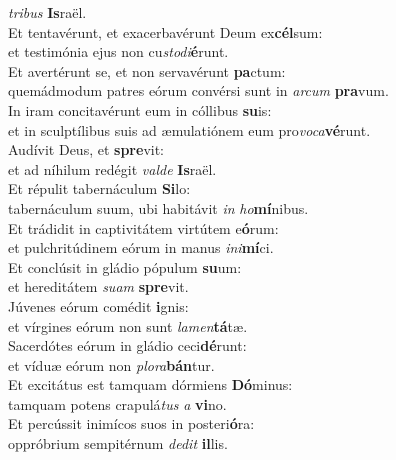 \oddverse \textit{tri}\textit{bus} \textbf{Is}raël.\\
\evenverse Et tentavérunt, et exacerbavérunt Deum ex\textbf{cél}sum:~\*\\
\evenverse et testimónia ejus non cu\textit{sto}\textit{di}\textbf{é}runt.\\
\oddverse Et avertérunt se, et non servavérunt \textbf{pa}ctum:~\*\\
\oddverse quemádmodum patres eórum convérsi sunt in \textit{ar}\textit{cum} \textbf{pra}vum.\\
\evenverse In iram concitavérunt eum in cóllibus \textbf{su}is:~\*\\
\evenverse et in sculptílibus suis ad æmulatiónem eum pro\textit{vo}\textit{ca}\textbf{vé}runt.\\
\oddverse Audívit Deus, et \textbf{spre}vit:~\*\\
\oddverse et ad níhilum redégit \textit{val}\textit{de} \textbf{Is}raël.\\
\evenverse Et répulit tabernáculum \textbf{Si}lo:~\*\\
\evenverse tabernáculum suum, ubi habitávit \textit{in} \textit{ho}\textbf{mí}nibus.\\
\oddverse Et trádidit in captivitátem virtútem e\textbf{ó}rum:~\*\\
\oddverse et pulchritúdinem eórum in manus \textit{i}\textit{ni}\textbf{mí}ci.\\
\evenverse Et conclúsit in gládio pópulum \textbf{su}um:~\*\\
\evenverse et hereditátem \textit{su}\textit{am} \textbf{spre}vit.\\
\oddverse Júvenes eórum comédit \textbf{i}gnis:~\*\\
\oddverse et vírgines eórum non sunt \textit{la}\textit{men}\textbf{tá}tæ.\\
\evenverse Sacerdótes eórum in gládio ceci\textbf{dé}runt:~\*\\
\evenverse et víduæ eórum non \textit{plo}\textit{ra}\textbf{bán}tur.\\
\oddverse Et excitátus est tamquam dórmiens \textbf{Dó}minus:~\*\\
\oddverse tamquam potens crapulá\textit{tus} \textit{a} \textbf{vi}no.\\
\evenverse Et percússit inimícos suos in posteri\textbf{ó}ra:~\*\\
\evenverse oppróbrium sempitérnum \textit{de}\textit{dit} \textbf{il}lis.\\
